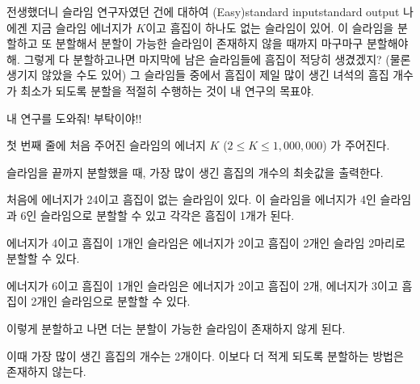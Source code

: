 \begin{problem}{전생했더니 슬라임 연구자였던 건에 대하여 (Easy)}{standard input}{standard output}
나에겐 지금 슬라임 에너지가 $K$이고 흠집이 하나도 없는 슬라임이 있어.
이 슬라임을 분할하고 또 분할해서 분할이 가능한 슬라임이 존재하지 않을 때까지 마구마구 분할해야해.
그렇게 다 분할하고나면 마지막에 남은 슬라임들에 흠집이 적당히 생겼겠지?
(물론 생기지 않았을 수도 있어)
그 슬라임들 중에서 흠집이 제일 많이 생긴 녀석의 흠집 개수가 최소가 되도록
분할을 적절히 수행하는 것이 내 연구의 목표야.

내 연구를 도와줘! 부탁이야!!

\InputFile
첫 번째 줄에 처음 주어진 슬라임의 에너지 $K$ ($2 \le K \le 1,000,000$) 가 주어진다.

\OutputFile
슬라임을 끝까지 분할했을 때, 가장 많이 생긴 흠집의 개수의 최솟값을 출력한다.

\Example

\begin{example}
%
%
%
\end{example}

\Notes
처음에 에너지가 24이고 흠집이 없는 슬라임이 있다.
이 슬라임을 에너지가 4인 슬라임과 6인 슬라임으로 분할할 수 있고 각각은 흠집이 1개가 된다.

에너지가 4이고 흠집이 1개인 슬라임은 에너지가 2이고 흠집이 2개인 슬라임 2마리로 분할할 수 있다.

에너지가 6이고 흠집이 1개인 슬라임은 에너지가 2이고 흠집이 2개, 에너지가 3이고 흠집이 2개인 슬라임으로 분할할 수 있다.

이렇게 분할하고 나면 더는 분할이 가능한 슬라임이 존재하지 않게 된다.

이때 가장 많이 생긴 흠집의 개수는 2개이다. 이보다 더 적게 되도록 분할하는 방법은 존재하지 않는다.

\end{problem}
